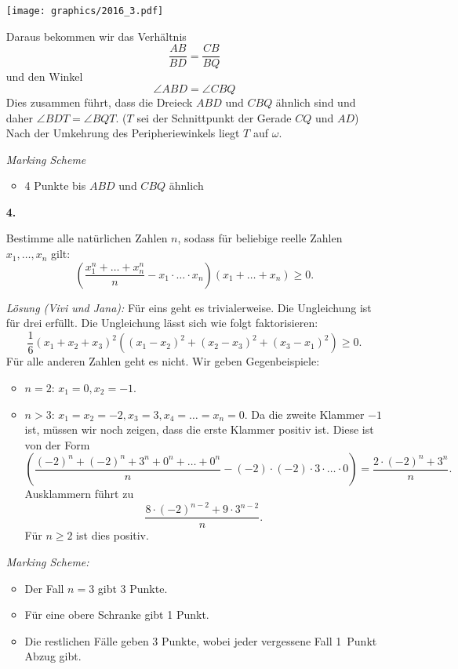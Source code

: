 \documentclass[language=german,style=solution]{smo}
\begin{document}
\begin{enumerate}
\texttt{[image: graphics/2016\_3.pdf]}

Daraus bekommen wir das Verhältnis
\[
\frac{AB}{BD} = \frac{CB}{BQ}
\]
und den Winkel
\[
\angle ABD = \angle CBQ
\]
Dies zusammen führt, dass die Dreieck $ABD$ und $CBQ$ ähnlich sind und daher $\angle BDT = \angle BQT$. ($T$ sei der Schnittpunkt der Gerade $CQ$ und $AD$) Nach der Umkehrung des Peripheriewinkels liegt $T$ auf $\omega$.

\textit{Marking Scheme}
\begin{itemize}
\item 4 Punkte bis $ABD$ und $CBQ$ ähnlich
\end{itemize}


\newpage


\item[\textbf{4.}] %

Bestimme alle natürlichen Zahlen $n$, sodass für beliebige reelle Zahlen $x_1, \ldots, x_n$ gilt:
\[
\left(\frac{x_1^n + \ldots + x_n^n}{n} - x_1\cdot \ldots \cdot x_n\right) \left(x_1 + \ldots + x_n \right)  \geq 0.
\]

\textit{Lösung (Vivi und Jana):}
Für eins geht es trivialerweise. Die Ungleichung ist für drei erfüllt. Die Ungleichung lässt sich wie folgt faktorisieren:
\[
\frac{1}{6} (x_1+x_2+x_3)^2((x_1-x_2)^2+(x_2-x_3)^2+(x_3-x_1)^2)\geq 0.
\]
Für alle anderen Zahlen geht es nicht. Wir geben Gegenbeispiele:
\begin{itemize}
\item $n=2$: $x_1=0, x_2=-1$.
\item $n>3$: $x_1=x_2=-2, x_3=3, x_4=\ldots=x_n=0$. Da die zweite Klammer $-1$ ist, müssen wir noch zeigen, dass die erste Klammer positiv ist. Diese ist von der Form 
\[
\left(\frac{(-2)^n + (-2)^n+3^n+0^n+ \ldots + 0^n}{n} - (-2)\cdot(-2)\cdot3\cdot \ldots\cdot0\right)=\frac{2\cdot(-2)^n+3^n}{n}.
\]
Ausklammern führt zu 
\[
\frac{8\cdot(-2)^{n-2}+9\cdot3^{n-2}}{n}.
\]
Für $n\geq2$ ist dies positiv.
\end{itemize}

\textit{Marking Scheme:}
\begin{itemize}
\item Der Fall $n=3$ gibt 3 Punkte.
\item Für eine obere Schranke gibt 1 Punkt.
\item Die restlichen Fälle geben 3 Punkte, wobei jeder vergessene Fall 1~Punkt Abzug gibt.

\end{itemize}



\end{enumerate}
\end{document}
